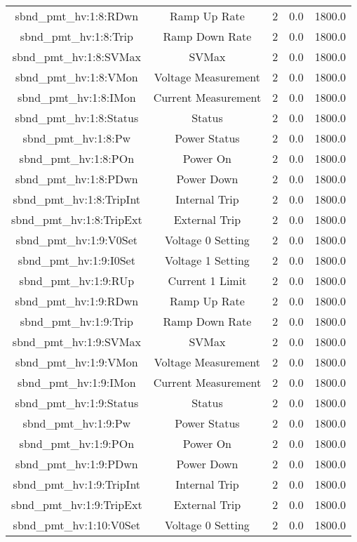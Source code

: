 \begin{center}
\begin{longtable}{c | c c c c }
sbnd\_pmt\_hv:1:8:RDwn & Ramp Up Rate & 2 & 0.0 & 1800.0\\ 
sbnd\_pmt\_hv:1:8:Trip & Ramp Down Rate & 2 & 0.0 & 1800.0\\ 
sbnd\_pmt\_hv:1:8:SVMax & SVMax & 2 & 0.0 & 1800.0\\ 
sbnd\_pmt\_hv:1:8:VMon & Voltage Measurement & 2 & 0.0 & 1800.0\\ 
sbnd\_pmt\_hv:1:8:IMon & Current Measurement & 2 & 0.0 & 1800.0\\ 
sbnd\_pmt\_hv:1:8:Status & Status & 2 & 0.0 & 1800.0\\ 
sbnd\_pmt\_hv:1:8:Pw & Power Status & 2 & 0.0 & 1800.0\\ 
sbnd\_pmt\_hv:1:8:POn & Power On & 2 & 0.0 & 1800.0\\ 
sbnd\_pmt\_hv:1:8:PDwn & Power Down & 2 & 0.0 & 1800.0\\ 
sbnd\_pmt\_hv:1:8:TripInt & Internal Trip & 2 & 0.0 & 1800.0\\ 
sbnd\_pmt\_hv:1:8:TripExt & External Trip & 2 & 0.0 & 1800.0\\ 
sbnd\_pmt\_hv:1:9:V0Set & Voltage 0 Setting & 2 & 0.0 & 1800.0\\ 
sbnd\_pmt\_hv:1:9:I0Set & Voltage 1 Setting & 2 & 0.0 & 1800.0\\ 
sbnd\_pmt\_hv:1:9:RUp & Current 1 Limit & 2 & 0.0 & 1800.0\\ 
sbnd\_pmt\_hv:1:9:RDwn & Ramp Up Rate & 2 & 0.0 & 1800.0\\ 
sbnd\_pmt\_hv:1:9:Trip & Ramp Down Rate & 2 & 0.0 & 1800.0\\ 
sbnd\_pmt\_hv:1:9:SVMax & SVMax & 2 & 0.0 & 1800.0\\ 
sbnd\_pmt\_hv:1:9:VMon & Voltage Measurement & 2 & 0.0 & 1800.0\\ 
sbnd\_pmt\_hv:1:9:IMon & Current Measurement & 2 & 0.0 & 1800.0\\ 
sbnd\_pmt\_hv:1:9:Status & Status & 2 & 0.0 & 1800.0\\ 
sbnd\_pmt\_hv:1:9:Pw & Power Status & 2 & 0.0 & 1800.0\\ 
sbnd\_pmt\_hv:1:9:POn & Power On & 2 & 0.0 & 1800.0\\ 
sbnd\_pmt\_hv:1:9:PDwn & Power Down & 2 & 0.0 & 1800.0\\ 
sbnd\_pmt\_hv:1:9:TripInt & Internal Trip & 2 & 0.0 & 1800.0\\ 
sbnd\_pmt\_hv:1:9:TripExt & External Trip & 2 & 0.0 & 1800.0\\ 
sbnd\_pmt\_hv:1:10:V0Set & Voltage 0 Setting & 2 & 0.0 & 1800.0\\ 

\end{longtable}
\end{center}
